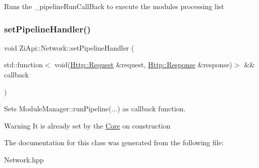 Runs the \+\_\+pipeline\+Run\+Call\+Back to execute the module\textquotesingle{}s processing list 
\begin{DoxyCode}{0}
\DoxyCodeLine{}
\DoxyCodeLine{}
\end{DoxyCode}
 \mbox{\label{classZiApi_1_1Network_a781d6d87558f714e93d89e098039ee27}} 
\subsubsection{\texorpdfstring{setPipelineHandler()}{setPipelineHandler()}}
{\footnotesize\ttfamily void Zi\+Api\+::\+Network\+::set\+Pipeline\+Handler (\begin{DoxyParamCaption}\item[{std\+::function$<$ void(\mbox{\hyperlink{classHttp_1_1Request}{Http\+::\+Request}} \&request, \mbox{\hyperlink{classHttp_1_1Response}{Http\+::\+Response}} \&response)$>$ \&\&}]{callback }\end{DoxyParamCaption})\hspace{0.3cm}{\ttfamily [inline]}}



Sets Module\+Manager\+::run\+Pipeline(...) as callback function. 

\begin{DoxyWarning}{Warning}
It is already set by the \mbox{\hyperlink{classZiApi_1_1Core}{Core}} on construction 
\end{DoxyWarning}


The documentation for this class was generated from the following file\+:\begin{DoxyCompactItemize}
\item 
Network.\+hpp\end{DoxyCompactItemize}
